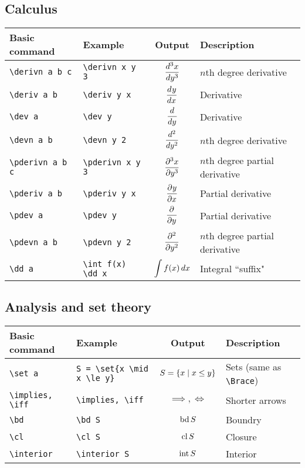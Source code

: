 \documentclass{article}
\begin{document}
\renewcommand{\arraystretch}{2.5} 

\subsection*{Calculus}

\begin{tabular}{llc  l}
Basic command & Example &  Output & Description\\
\hline
\verb|\derivn a b c| & \verb|\derivn x y 3| &  $\displaystyle \frac{d^{3}{x}}{ d {y}^{3}}$ & $n$th degree derivative\\
\verb|\deriv a b| & \verb|\deriv y x| &  $\displaystyle \frac{d^{}{y}}{ d {x}^{}}$ & Derivative\\
\verb|\dev a| & \verb|\dev y| &  $\displaystyle \frac{d^{}{}}{ d {y}^{}}$ & Derivative\\
\verb|\devn a b| & \verb|\devn y 2| &  $\displaystyle \frac{d^{2}{}}{ d {y}^{2}}$ & $n$th degree derivative\\
\verb|\pderivn a b c| & \verb|\pderivn x y 3| &  $\displaystyle \frac{\partial^{3}{x}}{ \partial {y}^{3}}$ & $n$th degree partial derivative\\
\verb|\pderiv a b| & \verb|\pderiv y x| &  $\displaystyle \frac{\partial^{}{y}}{ \partial {x}^{}}$ & Partial derivative\\
\verb|\pdev a| & \verb|\pdev y| &  $\displaystyle \frac{\partial^{}{}}{ \partial {y}^{}}$ & Partial derivative\\
\verb|\pdevn a b| & \verb|\pdevn y 2| &  $\displaystyle \frac{\partial^{2}{}}{ \partial {y}^{2}}$ & $n$th degree partial derivative\\
\verb|\dd a| & \verb|\int f(x) \dd x| & $\displaystyle \int f(x) \, d {x}$ & Integral ``suffix"
\end{tabular}

\renewcommand{\arraystretch}{1.5} 

\subsection*{Analysis and set theory}

\begin{tabular}{llc  l}
Basic command & Example &  Output & Description\\
\hline
\verb|\set a| & \verb+S = \set{x \mid x \le y}+ &  $S = \left\{ x \mid x \le y \right\}$ & Sets (same as \verb+\Brace+)\\
\verb|\implies, \iff| & \verb|\implies, \iff| &  $\implies, \iff$ & Shorter arrows\\
\verb|\bd| & \verb|\bd S| &  $\mathrm{bd} \, S$ & Boundry\\
\verb|\cl| & \verb|\cl S| &  $\mathrm{cl} \, S$ & Closure\\
\verb|\interior| & \verb|\interior S| &  $\mathrm{int} \, S$ & Interior\\
\end{tabular}
\end{document}
